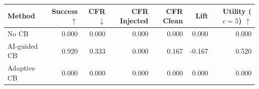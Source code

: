 \begin{tabular}{lrrrrrr}
\toprule
Method & Success $\uparrow$ & CFR $\downarrow$ & CFR Injected & CFR Clean & Lift & Utility ($c=5$) $\uparrow$ \\
\midrule
No CB & 0.000 & 0.000 & 0.000 & 0.000 & 0.000 & 0.000 \\
AI-guided CB & 0.920 & 0.333 & 0.000 & 0.167 & -0.167 & 0.520 \\
Adaptive CB & 0.000 & 0.000 & 0.000 & 0.000 & 0.000 & 0.000 \\
\bottomrule
\end{tabular}
